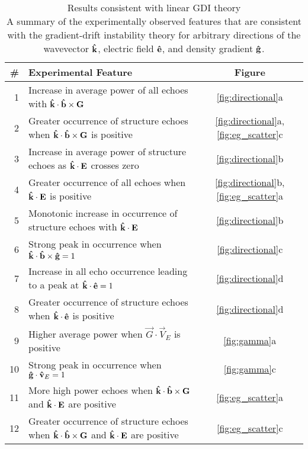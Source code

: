 \begin{table}
\centering
\begin{tabular}{rlc}
	\textbf{\#}& \textbf{Experimental Feature} & \textbf{Figure} \\
	\hline
	1&Increase in average power of all echoes with \(\mathbf{\hat{k}}\cdot\mathbf{\hat{b}}\times\mathbf{G}\) & \ref{fig:directional}a \\
	2&Greater occurrence of structure echoes when \(\mathbf{\hat{k}}\cdot\mathbf{\hat{b}}\times\mathbf{G}\) is positive & \ref{fig:directional}a, \ref{fig:eg_scatter}c \\
	3&Increase in average power of structure echoes as \(\mathbf{\hat{k}}\cdot\mathbf{E}\) crosses zero & \ref{fig:directional}b \\
	4&Greater occurrence of all echoes when \(\mathbf{\hat{k}}\cdot\mathbf{E}\) is positive & \ref{fig:directional}b, \ref{fig:eg_scatter}a \\
	5&Monotonic increase in occurrence of structure echoes with \(\mathbf{\hat{k}}\cdot\mathbf{E}\) & \ref{fig:directional}b \\
	6&Strong peak in occurrence when \(\mathbf{\hat{k}}\cdot\mathbf{\hat{b}}\times\mathbf{\hat{g}} = 1\) & \ref{fig:directional}c \\
	7&Increase in all echo occurrence leading to a peak at \(\mathbf{\hat{k}}\cdot\mathbf{\hat{e}}=1\) & \ref{fig:directional}d \\
	8&Greater occurrence of structure echoes when \(\mathbf{\hat{k}}\cdot\mathbf{\hat{e}}\) is positive & \ref{fig:directional}d \\
	9&Higher average power when \(\vec{G}\cdot\vec{V}_E\) is positive & \ref{fig:gamma}a \\
	10&Strong peak in occurrence when \(\mathbf{\hat{g}}\cdot\mathbf{\hat{v}}_E = 1\) & \ref{fig:gamma}c \\
	11&More high power echoes when \(\mathbf{\hat{k}}\cdot\mathbf{\hat{b}}\times\mathbf{G}\) and \(\mathbf{\hat{k}}\cdot\mathbf{E}\) are positive & \ref{fig:eg_scatter}a \\
	12&Greater occurrence of structure echoes when \(\mathbf{\hat{k}}\cdot\mathbf{\hat{b}}\times\mathbf{G}\) and \(\mathbf{\hat{k}}\cdot\mathbf{E}\) are positive & \ref{fig:eg_scatter}c \\
\end{tabular}
\caption[Results consistent with linear GDI theory]{{\:}Results consistent with linear GDI theory\\ A summary of the experimentally observed features that are consistent with the gradient-drift instability theory for arbitrary directions of the wavevector \(\mathbf{\hat{k}}\), electric field \(\mathbf{\hat{e}}\), and density gradient \(\mathbf{\hat{g}}\).}
\label{tab:results}
\end{table}

